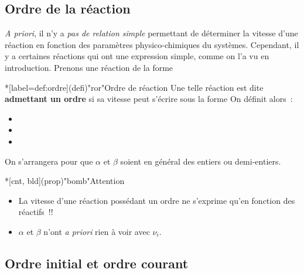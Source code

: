 \documentclass[../../main/main.tex]{subfiles}
\begin{document}
\subsection{Ordre de la réaction}
\textit{A priori}, il n'y a \textit{pas de relation simple} permettant de
déterminer la vitesse d'une réaction en fonction des paramètres
physico-chimiques du systèmes. Cependant, il y a certaines réactions qui ont une
expression simple, comme on l'a vu en introduction. Prenons une réaction de la
forme
\psw{
\[
	a\ce{A} + b\ce{B} = c\ce{C} + d\ce{D}
	\Longleftrightarrow
	\sum_{i=1}^{p} \left| \nu_i \right| {\ce{R}}_i = \sum_{i=p+1}^{N} \nu_i {\ce{P}}_i
\]
}
\vspace{-15pt}
\begin{tcb}*[label=def:ordre](defi)"ror"{Ordre de réaction}
	Une telle réaction est dite \textbf{admettant un ordre} si sa vitesse peut
	s'écrire sous la forme
	\psw{
	\[
		\boxed{v = k[\ce{A}]^\alpha[\ce{B}]^\beta}
		\Longleftrightarrow
		\boxed{v = k \prod_{i=1}^{p}[{\ce{R}}_i]^{m_i}}
	\]
	}
	On définit alors~:
	\begin{itemize}
		\item {}
		\item {}
		\item {}
	\end{itemize}
	On s'arrangera pour que $\alpha$ et $\beta$ soient en général des entiers ou
	demi-entiers.
\end{tcb}

\begin{tcb}*[cnt, bld](prop)"bomb"{Attention}
	\begin{itemize}
		\item La vitesse d'une réaction possédant un ordre ne s'exprime qu'en fonction des
		      réactifs~!!
		\item $\alpha$ et $\beta$ n'ont \textit{a priori} rien à
		      voir avec $\nu_i$.
	\end{itemize}
\end{tcb}

\subsection{Ordre initial et ordre courant}
\end{document}
